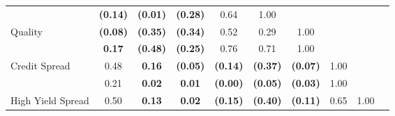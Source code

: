 \documentclass[12pt]{article}
\begin{document}
\begin{table}[H]
{\begin{tabular}{@{}lccccccccc@{}}
                      & {\color[HTML]{303498} \textbf{(0.14)}} & {\color[HTML]{303498} \textbf{(0.01)}} & {\color[HTML]{303498} \textbf{(0.28)}} & {\color[HTML]{303498} 0.64}            & {\color[HTML]{303498} 1.00}                              & \multicolumn{1}{l}{}                   & \multicolumn{1}{l}{}                                    & \multicolumn{1}{l}{}                                        & \multicolumn{1}{l}{}                                  \\
Quality               & \textbf{(0.08)}                        & \textbf{(0.35)}                        & \textbf{(0.34)}                        & 0.52                                   & 0.29                                                     & 1.00                                   & \textbf{}                                               & \textbf{}                                                   & \textbf{}                                             \\
                      & {\color[HTML]{303498} \textbf{0.17}}   & {\color[HTML]{303498} \textbf{(0.48)}} & {\color[HTML]{303498} \textbf{(0.25)}} & {\color[HTML]{303498} 0.76}            & {\color[HTML]{303498} 0.71}                              & {\color[HTML]{303498} 1.00}            & \multicolumn{1}{l}{}                                    & \multicolumn{1}{l}{}                                        & \multicolumn{1}{l}{}                                  \\ \midrule
Credit Spread         & 0.48                                   & \textbf{0.16}                          & \textbf{(0.05)}                        & \textbf{(0.14)}                        & \textbf{(0.37)}                                          & \textbf{(0.07)}                        & 1.00                                                    & \textbf{}                                                   & \textbf{}                                             \\
                      & {\color[HTML]{303498} 0.21}            & {\color[HTML]{303498} \textbf{0.02}}   & {\color[HTML]{303498} \textbf{0.01}}   & {\color[HTML]{303498} \textbf{(0.00)}} & {\color[HTML]{303498} \textbf{(0.05)}}                   & {\color[HTML]{303498} \textbf{(0.03)}} & {\color[HTML]{303498} 1.00}                             & \multicolumn{1}{l}{}                                        & \multicolumn{1}{l}{}                                  \\
High Yield Spread     & 0.50                                   & \textbf{0.13}                          & \textbf{0.02}                          & \textbf{(0.15)}                        & \textbf{(0.40)}                                          & \textbf{(0.11)}                        & 0.65                                                    & 1.00                                                        & \textbf{}                                             \\

\end{tabular}}
\end{table}
\end{document}

